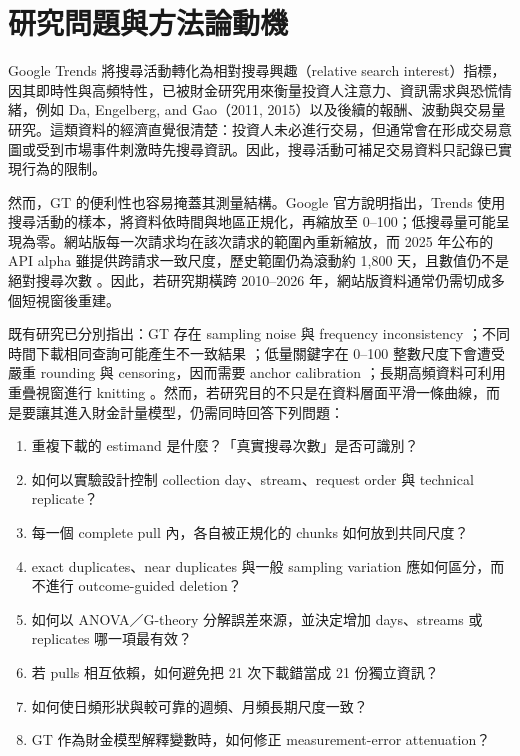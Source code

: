 \documentclass[12pt,a4paper,oneside]{article}
\begin{document}
\begingroup
{}
\setlength{\parskip}{0pt}
\small
\tableofcontents
\endgroup
\newpage

\section{研究問題與方法論動機}

Google Trends 將搜尋活動轉化為相對搜尋興趣（relative search interest）指標，因其即時性與高頻特性，已被財金研究用來衡量投資人注意力、資訊需求與恐慌情緒，例如 Da, Engelberg, and Gao（2011, 2015）以及後續的報酬、波動與交易量研究。這類資料的經濟直覺很清楚：投資人未必進行交易，但通常會在形成交易意圖或受到市場事件刺激時先搜尋資訊。因此，搜尋活動可補足交易資料只記錄已實現行為的限制。

然而，GT 的便利性也容易掩蓋其測量結構。Google 官方說明指出，Trends 使用搜尋活動的樣本，將資料依時間與地區正規化，再縮放至 0--100；低搜尋量可能呈現為零。網站版每一次請求均在該次請求的範圍內重新縮放，而 2025 年公布的 API alpha 雖提供跨請求一致尺度，歷史範圍仍為滾動約 1,800 天，且數值仍不是絕對搜尋次數 \cite{googlefaq,googleapi2025}。因此，若研究期橫跨 2010--2026 年，網站版資料通常仍需切成多個短視窗後重建。

既有研究已分別指出：GT 存在 sampling noise 與 frequency inconsistency \cite{eichenauer2022}；不同時間下載相同查詢可能產生不一致結果 \cite{cebrian2024,medeiros2021}；低量關鍵字在 0--100 整數尺度下會遭受嚴重 rounding 與 censoring，因而需要 anchor calibration \cite{west2020}；長期高頻資料可利用重疊視窗進行 knitting \cite{bleher2022}。然而，若研究目的不只是在資料層面平滑一條曲線，而是要讓其進入財金計量模型，仍需同時回答下列問題：

\begin{enumerate}
  \item 重複下載的 estimand 是什麼？「真實搜尋次數」是否可識別？
  \item 如何以實驗設計控制 collection day、stream、request order 與 technical replicate？
  \item 每一個 complete pull 內，各自被正規化的 chunks 如何放到共同尺度？
  \item exact duplicates、near duplicates 與一般 sampling variation 應如何區分，而不進行 outcome-guided deletion？
  \item 如何以 ANOVA／G-theory 分解誤差來源，並決定增加 days、streams 或 replicates 哪一項最有效？
  \item 若 pulls 相互依賴，如何避免把 21 次下載錯當成 21 份獨立資訊？
  \item 如何使日頻形狀與較可靠的週頻、月頻長期尺度一致？
  \item GT 作為財金模型解釋變數時，如何修正 measurement-error attenuation？
\end{enumerate}
\end{document}
